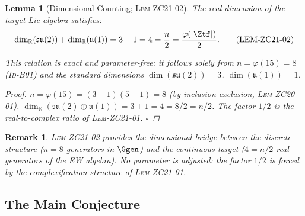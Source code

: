 \documentclass[12pt, a4paper]{article}
\newtheorem{lemma}{Lemma}[section]
\newtheorem{remark}{Remark}[section]
\begin{document}
\begin{lemma}[Dimensional Counting; \textsc{Lem-ZC21-02}]
\label{zc21:lem:dim}
The real dimension of the target Lie algebra satisfies:
\begin{equation}
  \dim_\mathbb{R}(\mathfrak{su}(2)) + \dim_\mathbb{R}(\mathfrak{u}(1))
  = 3 + 1 = 4
  = \frac{n}{2}
  = \frac{\varphi(|\Ztf|)}{2}.
  \tag{LEM-ZC21-02}
\end{equation}

This relation is exact and parameter-free:
it follows solely from $n = \varphi(15) = 8$ (\textsc{Id-B01})
and the standard dimensions $\dim(\mathfrak{su}(2)) = 3$,
$\dim(\mathfrak{u}(1)) = 1$.

\begin{proof}
$n = \varphi(15) = (3-1)(5-1) = 8$ (by inclusion-exclusion, \textsc{Lem-ZC20-01}).
$\dim_\mathbb{R}(\mathfrak{su}(2)\oplus\mathfrak{u}(1)) = 3 + 1 = 4 = 8/2 = n/2$.
The factor $1/2$ is the real-to-complex ratio of \textsc{Lem-ZC21-01}.
\hfill$\square$
\end{proof}
\end{lemma}

\begin{remark}
\textsc{Lem-ZC21-02} provides the \emph{dimensional bridge} between the
discrete structure ($n = 8$ generators in $\Ggen$) and the
continuous target ($4 = n/2$ real generators of the EW algebra).
No parameter is adjusted: the factor $1/2$ is forced by the
complexification structure of \textsc{Lem-ZC21-01}.
\end{remark}

\subsection{The Main Conjecture}
\label{zc21:sec:conjecture}
\end{document}
